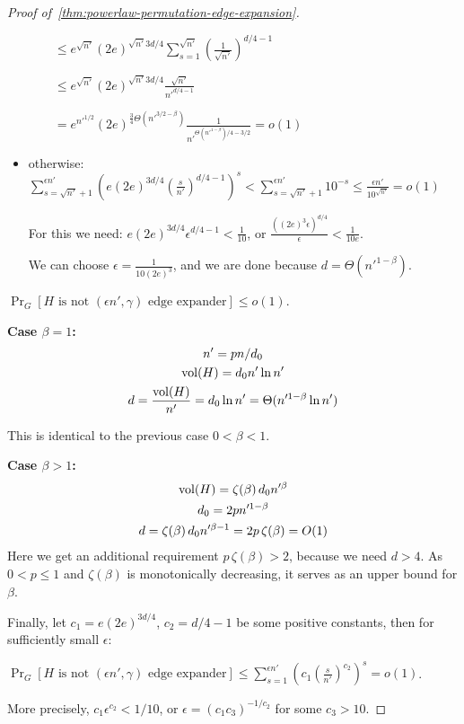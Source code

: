 \begin{proof}[Proof of~\autoref{thm:powerlaw-permutation-edge-expansion}]
\begin{itemize}
        $\qquad\leq e^{\sqrt{n'}}(2e)^{\sqrt{n'}3d/4}\sum_{s=1}^{\sqrt{n'}}{
            \left(\frac{1}{\sqrt{n'}}\right)^{d/4-1}
        }$

        $\qquad\leq e^{\sqrt{n'}}(2e)^{\sqrt{n'}3d/4}
        \frac{\sqrt{n'}}{n'^{d/4-1}}$
        
        $\qquad=e^{n'^{1/2}}(2e)^{\frac{3}{4}\Theta(n'^{3/2-\beta})}
        \frac{1}{n'^{\Theta(n'^{1-\beta})/4-3/2}}=o(1)$

        \item otherwise:
        $\sum_{s=\sqrt{n'}+1}^{\epsilon n'}{\left(
            e
            (2e)^{3d/4}
            \left(\frac{s}{n'}\right)^{d/4-1}
        \right)^s}
        <\sum_{s=\sqrt{n'}+1}^{\epsilon n'}{10^{-s}}\leq\frac{\epsilon n'}{10^{\sqrt{n'}}}=o(1)$
        
        For this we need:
        $e(2e)^{3d/4}\epsilon^{d/4-1}<\frac{1}{10}$, or
        $\frac{((2e)^3\epsilon)^{d/4}}{\epsilon}<\frac{1}{10e}$.
        
        We can choose $\epsilon=\frac{1}{10(2e)^3}$, and we are done because $d=\Theta(n'^{1-\beta})$.
    \end{itemize}
    
    $\Pr_G[H\text{ is not }(\epsilon n',\gamma)\text{ edge expander}]\leq o(1)$.
    
    \textbf{Case $\beta=1$:}
    \begin{gather*}
        n'=pn/d_0\\
        \operatorname*{vol}(H)=d_0n'\ln n'\\
        d=\frac{\operatorname*{vol}(H)}{n'}=d_0\ln n'=\Theta(n'^{1-\beta}\ln n')
    \end{gather*}
    
    This is identical to the previous case $0<\beta<1$.
    
    \textbf{Case $\beta>1$:}
    \begin{gather*}
        \operatorname*{vol}(H)=\zeta(\beta)\,d_0n'^\beta\\
        d_0=2pn'^{1-\beta}\\
        d=\zeta(\beta)\,d_0n'^{\beta-1}=2p\,\zeta(\beta)=O(1)
    \end{gather*}
    Here we get an additional requirement $p\,\zeta(\beta)>2$, because we need $d>4$.
    As~$0<p\leq 1$ and $\zeta(\beta)$ is monotonically decreasing, it serves as an upper bound for $\beta$.

    Finally, let $c_1=e(2e)^{3d/4}$, $c_2=d/4-1$ be some positive constants,
    then for sufficiently small $\epsilon$:

    $\Pr_G[H\text{ is not }(\epsilon n',\gamma)\text{ edge expander}]
    \leq\sum_{s=1}^{\epsilon n'}{\left(c_1\left(\frac{s}{n'}\right)^{c_2}\right)^s}=o(1)$.
    
    More precisely, $c_1\epsilon^{c_2}<1/10$, or
    $\epsilon=(c_1c_3)^{-1/c_2}$ for some $c_3>10$.
\end{proof}

